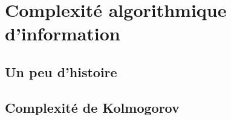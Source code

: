 \chapter{Complexité algorithmique d'information}

\section{Un peu d'histoire}
\section{Complexité de Kolmogorov}
\begin{definition}
\end{definition}